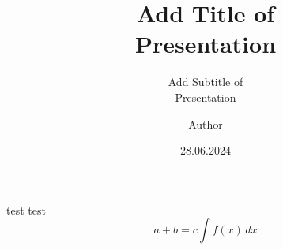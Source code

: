 \documentclass[aspectratio=169,professionalfonts]{beamer}
\title[Short Title]{Add Title of\\
 Presentation}
\subtitle{Add Subtitle of \\ Presentation}
\author[Author Short]{Author}
\date{28.06.2024}
\institute{Location}
\begin{document}
\begin{frame}[plain]
        \titlepage
\end{frame}

\begin{frame}{test}
test
\begin{equation}
    a + b = c \int f(x)\,dx
\end{equation}
\end{frame}
\end{document}
